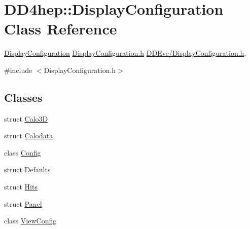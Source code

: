 \hypertarget{class_d_d4hep_1_1_display_configuration}{}\section{D\+D4hep\+:\+:Display\+Configuration Class Reference}
\label{class_d_d4hep_1_1_display_configuration}


\hyperlink{class_d_d4hep_1_1_display_configuration}{Display\+Configuration} \hyperlink{_display_configuration_8h}{Display\+Configuration.\+h} \hyperlink{_display_configuration_8h}{D\+D\+Eve/\+Display\+Configuration.\+h}.  




{\ttfamily \#include $<$Display\+Configuration.\+h$>$}

\subsection*{Classes}
\begin{DoxyCompactItemize}
\item 
struct \hyperlink{struct_d_d4hep_1_1_display_configuration_1_1_calo3_d}{Calo3D}
\item 
struct \hyperlink{struct_d_d4hep_1_1_display_configuration_1_1_calodata}{Calodata}
\item 
class \hyperlink{class_d_d4hep_1_1_display_configuration_1_1_config}{Config}
\item 
struct \hyperlink{struct_d_d4hep_1_1_display_configuration_1_1_defaults}{Defaults}
\item 
struct \hyperlink{struct_d_d4hep_1_1_display_configuration_1_1_hits}{Hits}
\item 
struct \hyperlink{struct_d_d4hep_1_1_display_configuration_1_1_panel}{Panel}
\item 
class \hyperlink{class_d_d4hep_1_1_display_configuration_1_1_view_config}{View\+Config}
\end{DoxyCompactItemize}

